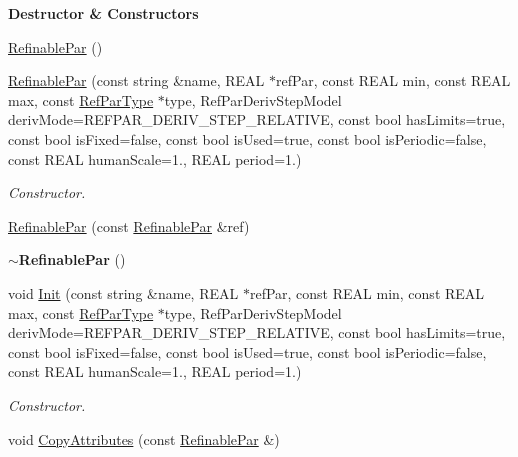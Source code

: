\begin{Indent}\textbf{ Destructor \& Constructors}\par
\begin{DoxyCompactItemize}
\item 
\mbox{\hyperlink{class_obj_cryst_1_1_refinable_par_ae358698d7ab55d87df8af8781946f293}{Refinable\+Par}} ()
\item 
\mbox{\hyperlink{class_obj_cryst_1_1_refinable_par_ac82759679653390c868ca7cbcb7e572c}{Refinable\+Par}} (const string \&name, R\+E\+AL $\ast$ref\+Par, const R\+E\+AL min, const R\+E\+AL max, const \mbox{\hyperlink{class_obj_cryst_1_1_ref_par_type}{Ref\+Par\+Type}} $\ast$type, Ref\+Par\+Deriv\+Step\+Model deriv\+Mode=R\+E\+F\+P\+A\+R\+\_\+\+D\+E\+R\+I\+V\+\_\+\+S\+T\+E\+P\+\_\+\+R\+E\+L\+A\+T\+I\+VE, const bool has\+Limits=true, const bool is\+Fixed=false, const bool is\+Used=true, const bool is\+Periodic=false, const R\+E\+AL human\+Scale=1., R\+E\+AL period=1.)
\begin{DoxyCompactList}\small\item\em Constructor. \end{DoxyCompactList}\item 
\mbox{\hyperlink{class_obj_cryst_1_1_refinable_par_a99cdc4550c46d90daf63b7f2e6d8d3c3}{Refinable\+Par}} (const \mbox{\hyperlink{class_obj_cryst_1_1_refinable_par}{Refinable\+Par}} \&ref)
\item 
\mbox{\label{class_obj_cryst_1_1_refinable_par_ada37c0119416edb03732703afaf737a1}} 
{\bfseries $\sim$\+Refinable\+Par} ()
\item 
void \mbox{\hyperlink{class_obj_cryst_1_1_refinable_par_a58cbd1b3c3ada8383ddb444f879a9495}{Init}} (const string \&name, R\+E\+AL $\ast$ref\+Par, const R\+E\+AL min, const R\+E\+AL max, const \mbox{\hyperlink{class_obj_cryst_1_1_ref_par_type}{Ref\+Par\+Type}} $\ast$type, Ref\+Par\+Deriv\+Step\+Model deriv\+Mode=R\+E\+F\+P\+A\+R\+\_\+\+D\+E\+R\+I\+V\+\_\+\+S\+T\+E\+P\+\_\+\+R\+E\+L\+A\+T\+I\+VE, const bool has\+Limits=true, const bool is\+Fixed=false, const bool is\+Used=true, const bool is\+Periodic=false, const R\+E\+AL human\+Scale=1., R\+E\+AL period=1.)
\begin{DoxyCompactList}\small\item\em Constructor. \end{DoxyCompactList}\item 
void \mbox{\hyperlink{class_obj_cryst_1_1_refinable_par_a5882aec9561125f6e81b81f175031652}{Copy\+Attributes}} (const \mbox{\hyperlink{class_obj_cryst_1_1_refinable_par}{Refinable\+Par}} \&)
\end{DoxyCompactItemize}
\end{Indent}
